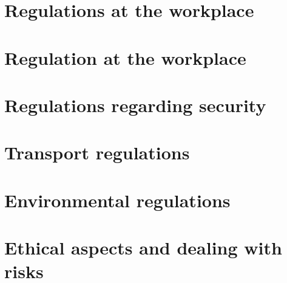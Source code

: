 \section{Regulations at the workplace}
\section{Regulation at the workplace}
\section{Regulations regarding security}
\section{Transport regulations}
\section{Environmental regulations}
\section{Ethical aspects and dealing with risks}
